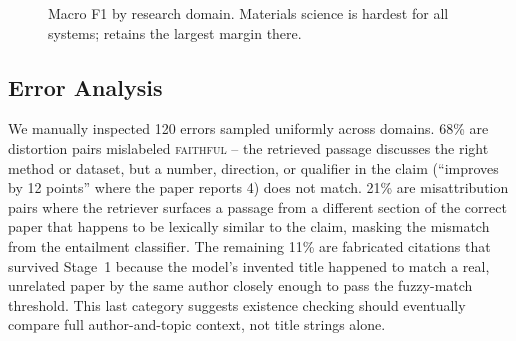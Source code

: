 \begin{figure}[t]
\centering
{}
\caption{Macro F1 by research domain. Materials science is hardest for all
systems;  retains the largest margin there.}
\label{fig:domain}
\end{figure}

\subsection{Error Analysis}
\label{sec:errors}

We manually inspected 120  errors sampled uniformly across
domains. 68\% are distortion pairs mislabeled \textsc{faithful} -- the
retrieved passage discusses the right method or dataset, but a number,
direction, or qualifier in the claim (``improves by 12 points'' where the
paper reports 4) does not match. 21\% are misattribution pairs where the
retriever surfaces a passage from a different section of the correct paper
that happens to be lexically similar to the claim, masking the mismatch
from the entailment classifier. The remaining 11\% are fabricated citations
that survived Stage~1 because the model's invented title happened to match
a real, unrelated paper by the same author closely enough to pass the
fuzzy-match threshold. This last category suggests existence checking
should eventually compare full author-and-topic context, not title strings
alone.
